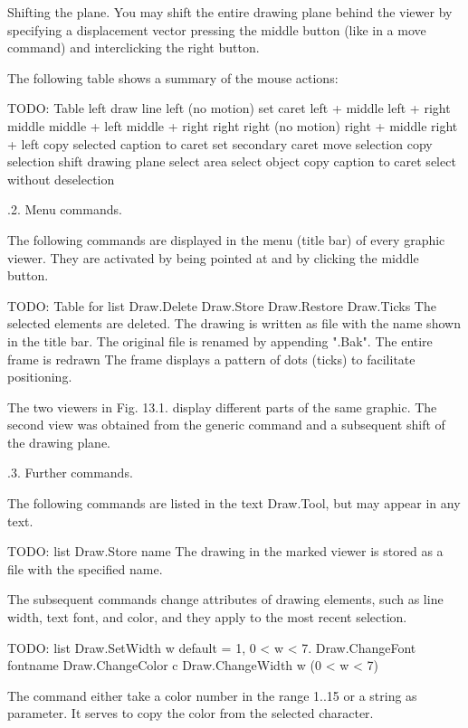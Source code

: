 Shifting the plane. You may shift the entire drawing plane behind the viewer by specifying a displacement vector pressing the middle button (like in a move command) and interclicking the right button.

The following table shows a summary of the mouse actions:

TODO: Table
left draw line left (no motion) set caret
left + middle left + right
middle middle + left middle + right
right
right (no motion) right + middle right + left
copy selected caption to caret set secondary caret
move selection copy selection shift drawing plane
select area
select object
copy caption to caret select without deselection

.2. Menu commands.

The following commands are displayed in the menu (title bar) of every graphic viewer. They are activated by being pointed at and by clicking the middle button.

TODO: Table for list
Draw.Delete Draw.Store
Draw.Restore Draw.Ticks
The selected elements are deleted.
The drawing is written as file with the name shown in the title bar. The original file is renamed by appending ".Bak".
The entire frame is redrawn
The frame displays a pattern of dots (ticks) to facilitate positioning.

The two viewers in Fig. 13.1. display different parts of the same graphic. The second view was obtained from the generic  command and a subsequent shift of the drawing plane.


.3. Further commands.

The following commands are listed in the text Draw.Tool, but may appear in any text.

TODO: list
Draw.Store name The drawing in the marked viewer is stored as a file with the specified name.

The subsequent commands change attributes of drawing elements, such as line width, text font, and color, and they apply to the most recent selection.

TODO: list
Draw.SetWidth w default = 1, 0 < w < 7.
Draw.ChangeFont fontname
Draw.ChangeColor c
Draw.ChangeWidth w (0 < w < 7)

The  command either take a color number in the range 1..15 or a string as parameter. It serves to copy the color from the selected character.

